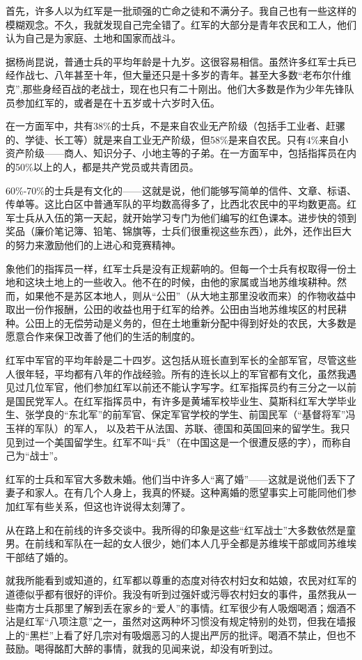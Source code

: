 \documentclass[10pt]{book}
\begin{document}
首先，许多人以为红军是一批顽强的亡命之徒和不满分子。我自己也有一些这样的模糊观念。不久，我就发现自己完全错了。红军的大部分是青年农民和工人，他们认为自己是为家庭、土地和国家而战斗。

据杨尚昆说，普通士兵的平均年龄是十九岁。这很容易相信。虽然许多红军士兵已经作战七、八年甚至十年，但大量还只是十多岁的青年。甚至大多数“老布尔什维克”,那些身经百战的老战士，现在也只有二十刚出。他们大多数是作为少年先锋队员参加红军的，或者是在十五岁或十六岁时入伍。

在一方面军中，共有38\%的士兵，不是来自农业无产阶级（包括手工业者、赶骡的、学徒、长工等）就是来自工业无产阶级，但58\%是来自农民。只有4\%来自小资产阶级——商人、知识分子、小地主等的子弟。在一方面军中，包括指挥员在内的50\%以上的人，都是共产党员或共青团员。

60\%-70\%的士兵是有文化的——这就是说，他们能够写简单的信件、文章、标语、传单等。这比白区中普通军队的平均数高得多了，比西北农民中的平均数更高。红军士兵从入伍的第一天起，就开始学习专门为他们编写的红色课本。进步快的领到奖品（廉价笔记簿、铅笔、锦旗等，士兵们很重视这些东西），此外，还作出巨大的努力来激励他们的上进心和竞赛精神。

象他们的指挥员一样，红军士兵是没有正规薪响的。但每一个士兵有权取得一份土地和这块土地上的一些收入。他不在的时候，由他的家属或当地苏维埃耕种。然而，如果他不是苏区本地人，则从“公田”（从大地主那里没收而来）的作物收益中取出一份作报酬，公田的收益也用于红军的给养。公田由当地苏维埃区的村民耕种。公田上的无偿劳动是义务的，但在土地重新分配中得到好处的农民，大多数是愿意合作来保卫改善了他们的生活的制度的。

红军中军官的平均年龄是二十四岁。这包括从班长直到军长的全部军官，尽管这些人很年轻，平均都有八年的作战经验。所有的连长以上的军官都有文化，虽然我遇见过几位军官，他们参加红军以前还不能认字写字。红军指挥员约有三分之一以前是国民党军人。在红军指挥员中，有许多是黄埔军校毕业生、莫斯科红军大学毕业生、张学良的“东北军”的前军官、保定军官学校的学生、前国民军（“基督将军”冯玉祥的军队）的军人， 以及若干从法国、苏联、德国和英国回来的留学生。我只见到过一个美国留学生。红军不叫“兵”（在中国这是一个很遭反感的字），而称自己为“战士”。

红军的士兵和军官大多数未婚。他们当中许多人“离了婚”——这就是说他们丢下了妻子和家人。在有几个人身上，我真的怀疑。这种离婚的愿望事实上可能同他们参加红军有些关系，但这也许说得太刻薄了。

从在路上和在前线的许多交谈中。我所得的印象是这些“红军战士”大多数依然是童男。在前线和军队在一起的女人很少，她们本人几乎全都是苏维埃干部或同苏维埃干部结了婚的。

就我所能看到或知道的，红军都以尊重的态度对待农村妇女和姑娘，农民对红军的道德似乎都有很好的评价。我没有听到过强奸或污辱农村妇女的事件，虽然我从一些南方士兵那里了解到丢在家乡的“爱人”的事情。红军很少有人吸烟喝酒；烟酒不沾是红军“八项注意”之一，虽然对这两种坏习惯没有规定特别的处罚，但我在墙报上的“黑栏”上看了好几宗对有吸烟恶习的人提出严厉的批评。喝酒不禁止，但也不鼓励。喝得酩酊大醉的事情，就我的见闻来说，却没有听到过。
\end{document}
